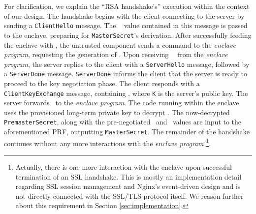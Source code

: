 \documentclass[../../main.tex]{subfiles}
\begin{document}
For clarification, we explain the ``RSA handshake's'' execution within
the context of our design. The handshake begins with the client
connecting to the server by sending a \texttt{ClientHello} message.
The \crandom~ value contained in this message is passed to the
enclave, preparing for \texttt{MasterSecret}'s derivation. After
successfully feeding the enclave with \crandom, the untrusted
component sends a command to the \textit{enclave program}, requesting
the generation of \srandom. Upon receiving ~\srandom~from the
\textit{enclave program}, the server replies to the client with a
\texttt{ServerHello} message, followed by a \texttt{ServerDone}
message. \texttt{ServerDone} informs the client that the server is
ready to proceed to the key negotiation phase. The client responds with a
\texttt{ClientKeyExchange} message, containing \premaster, where
\texttt{K} is the server's public key. The server forwards
\premaster~to the \textit{enclave program}. The code running within
the enclave uses the provisioned long-term private key to decrypt
\premaster. The now-decrypted \texttt{PremasterSecret}, along with the
pre-negotiated \crandom~and \srandom~values are input to the
aforementioned PRF, outputting \texttt{MasterSecret}. The remainder of
the handshake continues without any more interactions with the
\textit{enclave program} \footnote{Actually, there is one more
  interaction with the enclave upon successful termination of an SSL
  handshake. This is mostly an implementation detail regarding SSL
  session management and Nginx's event-driven design and is not
  directly connected with the SSL/TLS protocol itself. We reason
  further about this requirement in Section
  \ref{sec:implementation}.}. %

\end{document}
